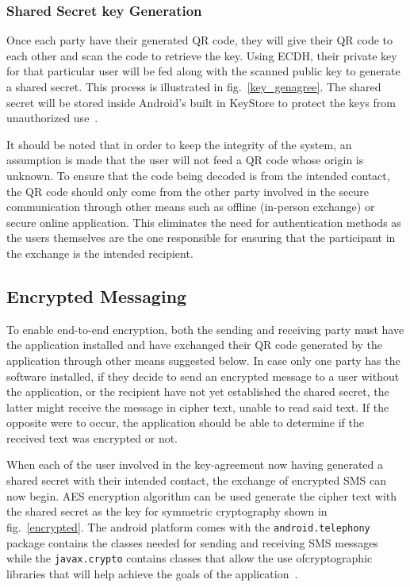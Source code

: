 \documentclass[journal]{./IEEE/IEEEtran}
\begin{document}
\subsubsection{Shared Secret key Generation}
Once each party have their generated QR code, they will give their QR code to
each other and scan the code to retrieve the key. Using ECDH,
their private key for that particular user will be fed along with the scanned
public key to generate a shared secret. This process is illustrated in
fig.~\ref{key_genagree}.
The shared secret will be stored inside Android's built in KeyStore to protect
the keys from unauthorized use~\cite{android_keystore}.

It should be noted that in order to keep the integrity of the system,
an assumption is made that the user will not feed a QR code
whose origin is unknown. To ensure that the code being decoded is from the
intended contact, the QR code should only come from the other party involved
in the secure communication through other means such as offline
(in-person exchange) or secure online application. This eliminates the need
for authentication methods as the users themselves are the one responsible
for ensuring that the participant in the exchange is the intended recipient.
\subsection{Encrypted Messaging}
To enable end-to-end encryption, both the sending and receiving party must
have the application installed and have exchanged their QR code generated by
the application through other means suggested below. In case only one party
has the software installed, if they decide to send an encrypted message to
a user without the application, or the recipient have not yet established the
shared secret, the latter might receive the message in
cipher text, unable to read said text. If the opposite were to occur,
the application should be able to determine if the received text was encrypted
or not.

When each of the user involved in the key-agreement now having generated a
shared secret with their intended contact, the exchange of encrypted SMS
can now begin. AES encryption algorithm can be used generate the cipher text
with the shared secret as the key for symmetric cryptography shown in
fig.~\ref{encrypted}. The android platform comes with the
\lstinline{android.telephony} package contains the classes needed for sending
and receiving SMS messages while the \lstinline{javax.crypto} contains
classes that allow the use ofcryptographic libraries that will help achieve
the goals of the application~\cite{android_pkg}.
\end{document}
